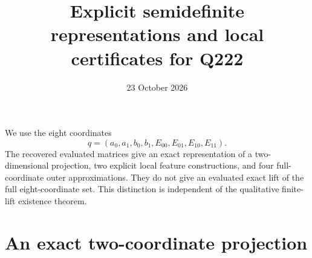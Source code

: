 \documentclass[11pt]{article}
\title{Explicit semidefinite representations and local certificates for Q222}
\author{}
\date{23 October 2026}
\begin{document}
\maketitle

We use the eight coordinates
\[
 q=(a_0,a_1,b_0,b_1,E_{00},E_{01},E_{10},E_{11}).
\]
The recovered evaluated matrices give an exact representation of a
two-dimensional projection, two explicit local feature constructions,
and four full-coordinate outer approximations. They do not give an
evaluated exact lift of the full eight-coordinate set. This distinction
is independent of the qualitative finite-lift existence theorem.

\section{An exact two-coordinate projection}
\end{document}

